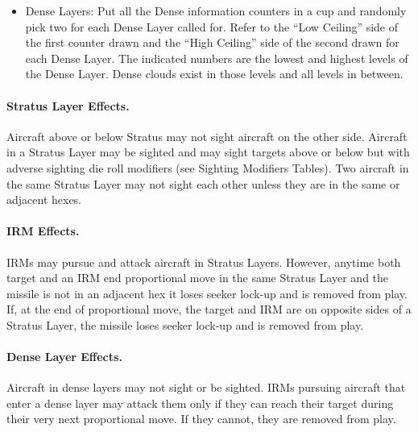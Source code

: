 \begin{advancedrules}
{\begin{itemize}
    \item Dense Layers: Put all the Dense information counters in a cup and randomly pick two for each Dense Layer called for. Refer to the “Low Ceiling” side of the first counter drawn and the “High Ceiling” side of the second drawn for each Dense Layer. The indicated numbers are the lowest and highest levels of the Dense Layer. Dense clouds exist in those levels and all levels in between.   
\end{itemize}


\paragraph{Stratus Layer Effects.} Aircraft  above or below Stratus may not sight aircraft  on the other side. Aircraft in a Stratus Layer may be sighted and may sight targets above or below but with adverse sighting die roll modifiers (see Sighting Modifiers Tables). Two aircraft in the same Stratus Layer may not sight each other unless they are in the same or adjacent hexes. 

\paragraph{IRM Effects.} IRMs may pursue and attack aircraft in Stratus Layers. However, anytime both target and an IRM end  proportional move in the same Stratus Layer and the missile is not in an adjacent hex it loses seeker lock-up and is removed from play. If, at the end of  proportional move, the target and IRM are on opposite sides of a Stratus Layer, the missile loses seeker lock-up and is removed from play.

\paragraph{Dense Layer Effects.} Aircraft in dense layers may not sight or be sighted. IRMs pursuing aircraft that enter a dense layer may attack them only if they can reach their target during their very next proportional move. If they cannot, they are removed from play.

}
\end{advancedrules}
